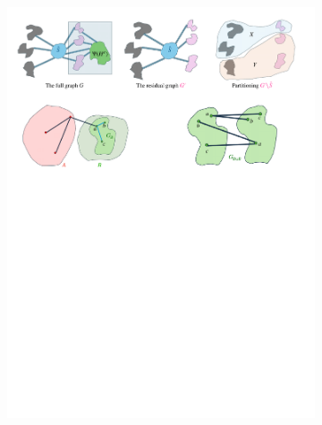 \documentclass[11pt]{article}
\begin{document}
\begin{figure}
\begin{subfigure}[t]{0.3\textwidth}
        \includegraphics[width=\textwidth]{assets/part-b.pdf}
        \caption{
        }
        \label{fig:after-deletions}
    \end{subfigure}
    \hfill
    \begin{subfigure}[t]{0.3\textwidth}
        \centering

\end{subfigure}
\end{figure}
\end{document}
